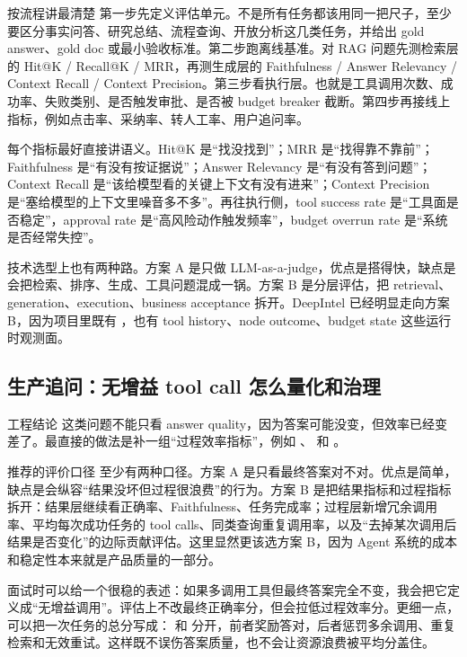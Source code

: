 \documentclass[12pt]{article}
\begin{document}
\begin{analysisBox}{按流程讲最清楚}
第一步先定义评估单元。不是所有任务都该用同一把尺子，至少要区分事实问答、研究总结、流程查询、开放分析这几类任务，并给出 gold answer、gold doc 或最小验收标准。第二步跑离线基准。对 RAG 问题先测检索层的 Hit@K / Recall@K / MRR，再测生成层的 Faithfulness / Answer Relevancy / Context Recall / Context Precision。第三步看执行层。也就是工具调用次数、成功率、失败类别、是否触发审批、是否被 budget breaker 截断。第四步再接线上指标，例如点击率、采纳率、转人工率、用户追问率。

每个指标最好直接讲语义。Hit@K 是“找没找到”；MRR 是“找得靠不靠前”；Faithfulness 是“有没有按证据说”；Answer Relevancy 是“有没有答到问题”；Context Recall 是“该给模型看的关键上下文有没有进来”；Context Precision 是“塞给模型的上下文里噪音多不多”。再往执行侧，tool success rate 是“工具面是否稳定”，approval rate 是“高风险动作触发频率”，budget overrun rate 是“系统是否经常失控”。

技术选型上也有两种路。方案 A 是只做 LLM-as-a-judge，优点是搭得快，缺点是会把检索、排序、生成、工具问题混成一锅。方案 B 是分层评估，把 retrieval、generation、execution、business acceptance 拆开。DeepIntel 已经明显走向方案 B，因为项目里既有 ，也有 tool history、node outcome、budget state 这些运行时观测面。
\end{analysisBox}

\subsection{生产追问：无增益 tool call 怎么量化和治理}
\begin{qaBox}{工程结论}
这类问题不能只看 answer quality，因为答案可能没变，但效率已经变差了。最直接的做法是补一组“过程效率指标”，例如 、 和 。
\end{qaBox}

\begin{analysisBox}{推荐的评价口径}
至少有两种口径。方案 A 是只看最终答案对不对。优点是简单，缺点是会纵容“结果没坏但过程很浪费”的行为。方案 B 是把结果指标和过程指标拆开：结果层继续看正确率、Faithfulness、任务完成率；过程层新增冗余调用率、平均每次成功任务的 tool calls、同类查询重复调用率，以及“去掉某次调用后结果是否变化”的边际贡献评估。这里显然更该选方案 B，因为 Agent 系统的成本和稳定性本来就是产品质量的一部分。

面试时可以给一个很稳的表述：如果多调用工具但最终答案完全不变，我会把它定义成“无增益调用”。评估上不改最终正确率分，但会拉低过程效率分。更细一点，可以把一次任务的总分写成： 和  分开，前者奖励答对，后者惩罚多余调用、重复检索和无效重试。这样既不误伤答案质量，也不会让资源浪费被平均分盖住。
\end{analysisBox}
\end{document}

